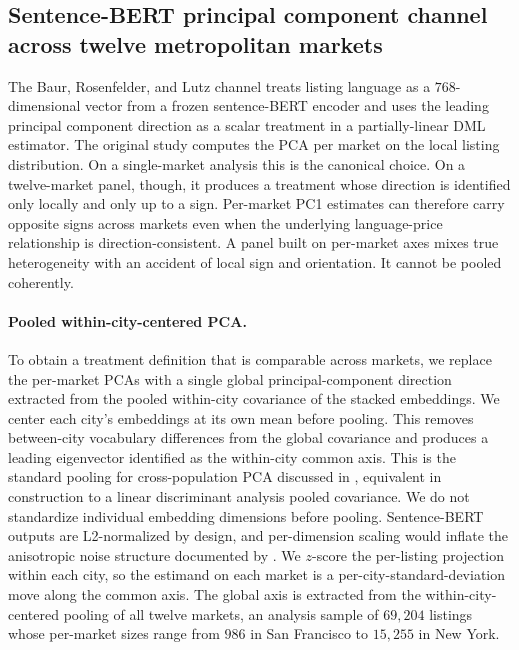 
\subsection{Sentence-BERT principal component channel across twelve metropolitan markets}
\label{sec:baur-12city}

The Baur, Rosenfelder, and Lutz channel \citep{baur2023automated} treats
listing language as a $768$-dimensional vector from a frozen sentence-BERT
encoder and uses the leading principal component direction as a scalar
treatment in a partially-linear DML estimator. The original study computes the
PCA per market on the local listing distribution. On a single-market analysis
this is the canonical choice. On a twelve-market panel, though, it produces a
treatment whose direction is identified only locally and only up to a sign.
Per-market PC1 estimates can therefore carry opposite signs across markets even when the
underlying language-price relationship is direction-consistent. A panel built
on per-market axes mixes true heterogeneity with an accident of
local sign and orientation. It cannot be pooled coherently.

\paragraph{Pooled within-city-centered PCA.} To obtain a treatment definition
that is comparable across markets, we replace the per-market PCAs with a single
global principal-component direction extracted from the pooled within-city
covariance of the stacked embeddings. We center each city's embeddings at its
own mean before pooling. This removes between-city vocabulary differences from
the global covariance and produces a leading eigenvector identified as the
within-city common axis. This is the standard pooling for cross-population PCA
discussed in \citet{flury1984}, equivalent in construction to a linear
discriminant analysis pooled covariance. We do not standardize individual
embedding dimensions before pooling. Sentence-BERT outputs are
L2-normalized by design, and per-dimension scaling would inflate the anisotropic
noise structure documented by \citet{ethayarajh2019contextual}. We $z$-score the
per-listing projection within each city, so the estimand on each market is a
per-city-standard-deviation move along the common axis. The global axis is
extracted from the within-city-centered pooling of all twelve markets, an
analysis sample of $69{,}204$ listings whose per-market sizes range from $986$ in
San Francisco to $15{,}255$ in New York.

